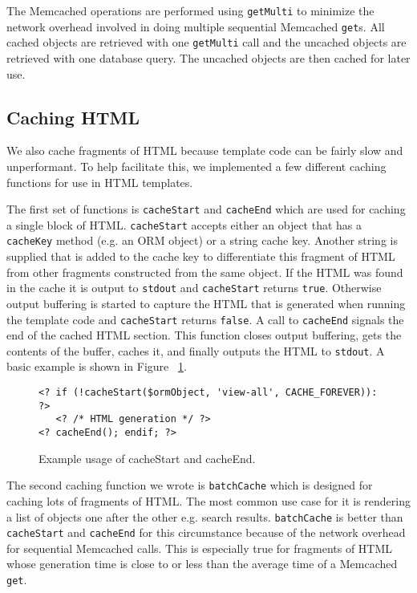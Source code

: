 \documentclass[12pt]{ucthesis}
\begin{document}
The {\textsf Memcached} operations are performed using {\tt getMulti} to minimize the network overhead involved in doing multiple sequential {\textsf Memcached} {\tt get}s.
All cached objects are retrieved with one {\tt getMulti} call and the uncached objects are retrieved with one database query.
The uncached objects are then cached for later use.

\subsection{Caching HTML}
We also cache fragments of HTML because template code can be fairly slow and unperformant.
To help facilitate this, we implemented a few different caching functions for use in HTML templates.

The first set of functions is {\tt cacheStart} and {\tt cacheEnd} which are used for caching a single block of HTML.
{\tt cacheStart} accepts either an object that has a {\tt cacheKey} method (e.g. an ORM object) or a string cache key.
Another string is supplied that is added to the cache key to differentiate this fragment of HTML from other fragments constructed from the same object.
If the HTML was found in the cache it is output to {\tt stdout} and {\tt cacheStart} returns {\tt true}.
Otherwise output buffering is started to capture the HTML that is generated when running the template code and {\tt cacheStart} returns {\tt false}.
A call to {\tt cacheEnd} signals the end of the cached HTML section.
This function closes output buffering, gets the contents of the buffer, caches it, and finally outputs the HTML to {\tt stdout}.
A basic example is shown in Figure ~\ref{fig:cacheStartExample}.

\begin{figure}[h]
\begin{verbatim}
<? if (!cacheStart($ormObject, 'view-all', CACHE_FOREVER)): ?>
   <? /* HTML generation */ ?>
<? cacheEnd(); endif; ?>
\end{verbatim}
\caption{Example usage of cacheStart and cacheEnd.}
\label{fig:cacheStartExample}
\end{figure}

The second caching function we wrote is {\tt batchCache} which is designed for caching lots of fragments of HTML.
The most common use case for it is rendering a list of objects one after the other e.g. search results.
{\tt batchCache} is better than {\tt cacheStart} and {\tt cacheEnd} for this circumstance because of the network overhead for sequential {\textsf Memcached} calls.
This is especially true for fragments of HTML whose generation time is close to or less than the average time of a {\textsf Memcached} {\tt get}.
\end{document}
